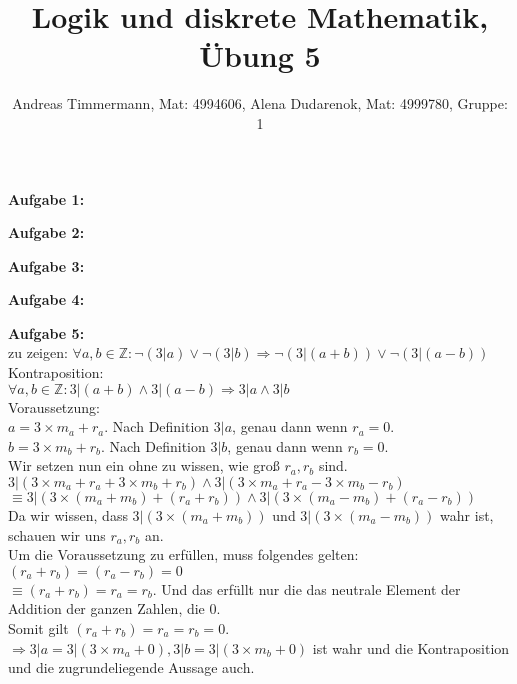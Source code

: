 \documentclass[a4paper]{scrartcl}
\title{Logik und diskrete Mathematik, Übung 5}
\author{Andreas Timmermann, Mat: 4994606, Alena Dudarenok, Mat: 4999780, Gruppe: 1}
\begin{document}
	\maketitle
	\begin{flushleft}
		\textbf{Aufgabe 1:}\\
	\end{flushleft}
	\begin{flushleft}
		\textbf{Aufgabe 2:}\\
	\end{flushleft}
	\begin{flushleft}
		\textbf{Aufgabe 3:}\\		
	\end{flushleft}
	\begin{flushleft}
		\textbf{Aufgabe 4:}\\		
	\end{flushleft}
	\begin{flushleft}
		\textbf{Aufgabe 5:}\\		
		zu zeigen: $\forall a,b\in \mathbb{Z}: \neg(3|a) \vee \neg(3|b) \Rightarrow \neg(3|(a+b)) \vee \neg(3|(a-b))$\\ 
		Kontraposition:\\
		$\forall a,b\in \mathbb{Z}: 3|(a+b) \wedge 3|(a-b) \Rightarrow 3|a \wedge 3|b$\\[1em]
		Voraussetzung:\\
		$a = 3\times m_a + r_a$. Nach Definition $3|a$, genau dann wenn $r_a = 0$.\\ 
		$b = 3\times m_b + r_b$. Nach Definition $3|b$, genau dann wenn $r_b = 0$.\\[1em]
		Wir setzen nun ein ohne zu wissen, wie groß $r_a,r_b$ sind.\\
		$3|(3\times m_a + r_a + 3\times m_b + r_b) \wedge 3|(3\times m_a + r_a - 3\times m_b - r_b)$\\
		$\equiv 3|(3\times (m_a + m_b) + (r_a + r_b)) \wedge 3|(3\times (m_a - m_b) + (r_a - r_b))$\\
		Da wir wissen, dass $3|(3\times (m_a + m_b))$ und $3|(3\times (m_a - m_b))$ wahr ist, schauen wir uns $r_a,r_b$ an.\\
		Um die Voraussetzung zu erfüllen, muss folgendes gelten: $(r_a + r_b) = (r_a - r_b) = 0$\\
		$\equiv (r_a + r_b) = r_a = r_b$. Und das erfüllt nur die das neutrale Element der Addition der ganzen Zahlen, die $0$.\\
		Somit gilt $(r_a + r_b) = r_a = r_b = 0$.\\
		$\Rightarrow 3|a = 3|(3\times m_a + 0), 3|b = 3|(3\times m_b + 0)$ ist wahr und die Kontraposition und die zugrundeliegende Aussage auch.
		
	\end{flushleft}
\end{document}
